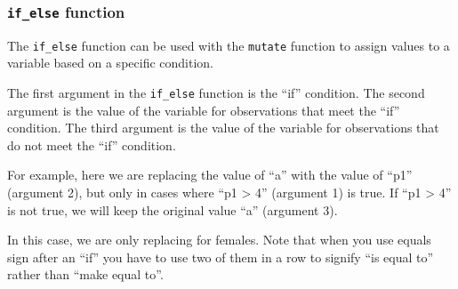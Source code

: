 \documentclass[]{book}
\newenvironment{Shaded}{\begin{snugshade}}{\end{snugshade}}
\newcommand{\DataTypeTok}[1]{\textcolor[rgb]{0.13,0.29,0.53}{#1}}
\newcommand{\DecValTok}[1]{\textcolor[rgb]{0.00,0.00,0.81}{#1}}
\newcommand{\KeywordTok}[1]{\textcolor[rgb]{0.13,0.29,0.53}{\textbf{#1}}}
\newcommand{\NormalTok}[1]{#1}
\newcommand{\OperatorTok}[1]{\textcolor[rgb]{0.81,0.36,0.00}{\textbf{#1}}}
\newcommand{\StringTok}[1]{\textcolor[rgb]{0.31,0.60,0.02}{#1}}
\begin{document}
\begin{Shaded}
\end{Shaded}

\hypertarget{if_else-function-1}{%
\subsubsection{\texorpdfstring{\texttt{if\_else}
function}{if\_else function}}\label{if_else-function-1}}

The \texttt{if\_else} function can be used with the \texttt{mutate}
function to assign values to a variable based on a specific condition.

The first argument in the \texttt{if\_else} function is the ``if''
condition. The second argument is the value of the variable for
observations that meet the ``if'' condition. The third argument is the
value of the variable for observations that do not meet the ``if''
condition.

For example, here we are replacing the value of ``a'' with the value of
``p1'' (argument 2), but only in cases where ``p1 \textgreater{} 4''
(argument 1) is true. If ``p1 \textgreater{} 4'' is not true, we will
keep the original value ``a'' (argument 3).

\begin{Shaded}
\end{Shaded}

In this case, we are only replacing for females. Note that when you use
equals sign after an ``if'' you have to use two of them in a row to
signify ``is equal to'' rather than ``make equal to''.

\begin{Shaded}
\end{Shaded}
\end{document}
